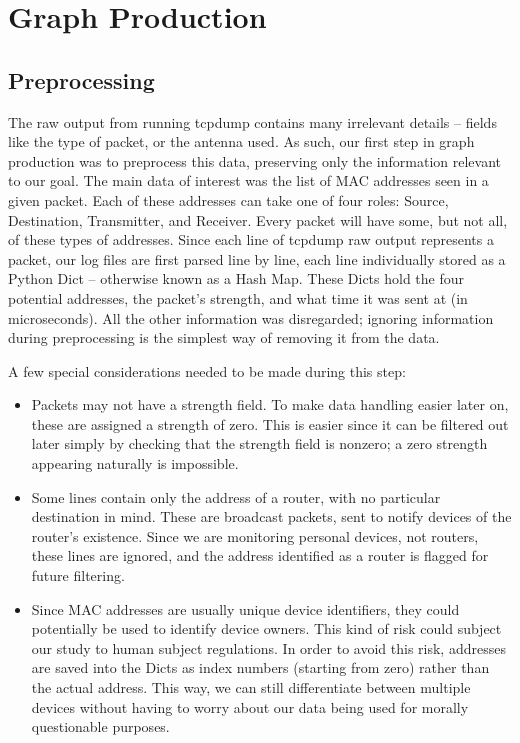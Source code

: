 \section{Graph Production}

\subsection{Preprocessing}


The raw output from running tcpdump contains many irrelevant details -- fields like the type of packet, or the antenna used.
As such, our first step in graph production was to preprocess this data, preserving only the information relevant to our goal.
The main data of interest was the list of MAC addresses seen in a given packet.
Each of these addresses can take one of four roles: Source, Destination, Transmitter, and Receiver.
Every packet will have some, but not all, of these types of addresses.
Since each line of tcpdump raw output represents a packet, our log files are first parsed line by line, each line individually stored as a Python Dict -- otherwise known as a Hash Map.
These Dicts hold the four potential addresses, the packet's strength, and what time it was sent at (in microseconds).
All the other information was disregarded; ignoring information during preprocessing is the simplest way of removing it from the data.

A few special considerations needed to be made during this step:
\begin{itemize}
\item Packets may not have a strength field.
  To make data handling easier later on, these are assigned a strength of zero.
  This is easier since it can be filtered out later simply by checking that the strength field is nonzero; a zero strength appearing naturally is impossible. 
\item Some lines contain only the address of a router, with no particular destination in mind.
  These are broadcast packets, sent to notify devices of the router's existence.
  Since we are monitoring personal devices, not routers, these lines are ignored, and the address identified as a router is flagged for future filtering.
\item Since MAC addresses are usually unique device identifiers, they could potentially be used to identify device owners.
  This kind of risk could subject our study to human subject regulations.
  In order to avoid this risk, addresses are saved into the Dicts as index numbers (starting from zero) rather than the actual address.
  This way, we can still differentiate between multiple devices without having to worry about our data being used for morally questionable purposes.
\end{itemize}


